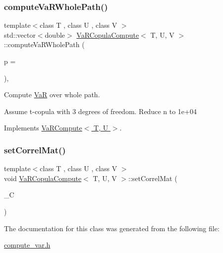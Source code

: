 \subsubsection{\texorpdfstring{compute\+Va\+R\+Whole\+Path()}{computeVaRWholePath()}}
{\footnotesize\ttfamily template$<$class T , class U , class V $>$ \\
std\+::vector$<$double$>$ \hyperlink{classVaRCopulaCompute}{Va\+R\+Copula\+Compute}$<$ T, U, V $>$\+::compute\+Va\+R\+Whole\+Path (\begin{DoxyParamCaption}\item[{size\+\_\+t}]{p = {} }\end{DoxyParamCaption})\hspace{0.3cm}{\ttfamily [inline]}, {\ttfamily [virtual]}}



Compute \hyperlink{classVaR}{VaR} over whole path. 

Assume t-\/copula with 3 degrees of freedom. Reduce n to 1e+04 

Implements \hyperlink{classVaRCompute_ad5ec9feb42ea2f99f2c91e793d18fe1b}{Va\+R\+Compute$<$ T, U $>$}.

\hypertarget{classVaRCopulaCompute_a8263b7ec27286cee0a65019c9a90f51d}{}\label{classVaRCopulaCompute_a8263b7ec27286cee0a65019c9a90f51d} 
\subsubsection{\texorpdfstring{set\+Correl\+Mat()}{setCorrelMat()}}
{\footnotesize\ttfamily template$<$class T , class U , class V $>$ \\
void \hyperlink{classVaRCopulaCompute}{Va\+R\+Copula\+Compute}$<$ T, U, V $>$\+::set\+Correl\+Mat (\begin{DoxyParamCaption}\item[{const Eigen\+::\+Matrix\+Xd \&}]{\+\_\+C }\end{DoxyParamCaption})\hspace{0.3cm}{\ttfamily [inline]}}



The documentation for this class was generated from the following file\+:\begin{DoxyCompactItemize}
\item 
\hyperlink{compute__var_8h}{compute\+\_\+var.\+h}\end{DoxyCompactItemize}
